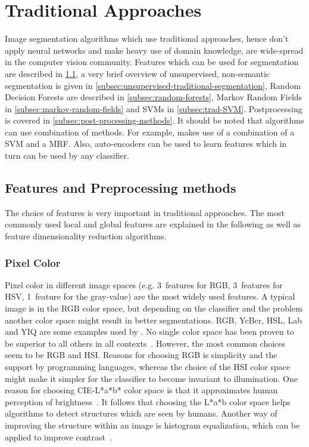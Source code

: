 \documentclass[technote,a4paper,leqno]{IEEEtran}
\makeatletter
\newcommand*{\eg}{e.g.\@\xspace}
\makeatother
\begin{document}
\section{Traditional Approaches}\label{sec:traditional-approaches}%
Image segmentation algorithms which use traditional approaches, hence don't
apply neural networks and make heavy use of domain knowledge, are wide-spread
in the computer vision community. Features which can be used for segmentation
are described in \cref{subsec:features}, a very brief overview of unsupervised,
non-semantic segmentation is given in
\cref{subsec:unsupervised-traditional-segmentation}, Random Decision
Forests are described in \cref{subsec:random-forests}, Markov Random Fields in \cref{subsec:markov-random-fields}
 and \glspl{SVM} in
\cref{subsec:trad-SVM}.
Postprocessing is covered in \cref{subsec:post-processing-methods}.
It should be noted that algorithms can use combination of methods. For example,
\cite{tighe2014scene} makes use of a combination of a \gls{SVM} and a
\gls{MRF}. Also, auto-encoders can be used to learn features which in turn
can be used by any classifier.
\subsection{Features and Preprocessing methods}\label{subsec:features}%
The choice of features is very important in traditional approaches.
The most commonly used local and global features are explained in the following
as well as feature dimensionality reduction algorithms.
\subsubsection{Pixel Color}
Pixel color in different image spaces (\eg 3~features for RGB, 3~features for
HSV, 1~feature for the gray-value) are the most widely used features. A typical
image is in the RGB color space, but depending on the classifier and the
problem another color space might result in better segmentations. RGB, YcBcr,
HSL, Lab and YIQ are some examples used by \cite{cohen2015memory}. No single
color space has been proven to be superior to all others in all
contexts~\cite{cheng2001color}. However, the most common choices seem to be RGB
and HSI\@. Reasons for choosing RGB is simplicity and the support by
programming languages, whereas the choice of the HSI color space might make it
simpler for the classifier to become invariant to illumination. One reason for
choosing CIE-L*a*b* color space is that it approximates human perception of
brightness~\cite{kasson1992analysis}. It follows that choosing the L*a*b color
space helps algorithms to detect structures which are seen by humans. Another
way of improving the structure within an image is histogram equalization, which
can be applied to improve contrast~\cite{pizer1987adaptive,4228537}.
\end{document}
